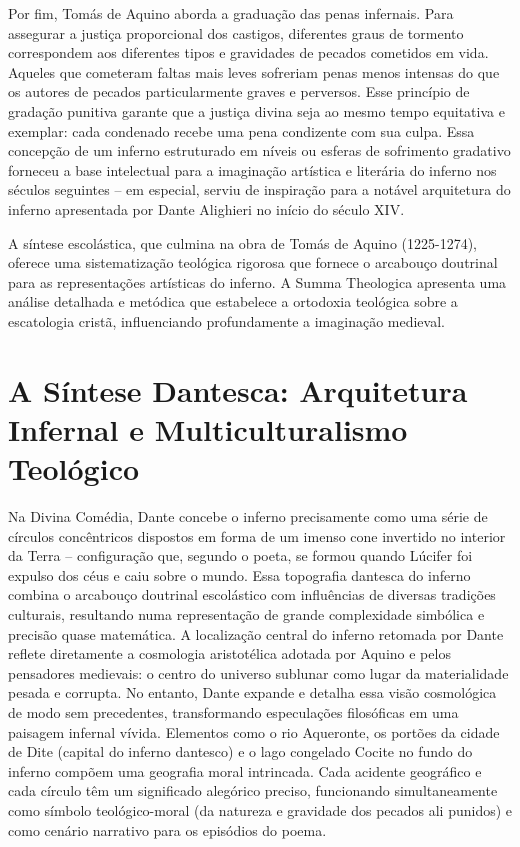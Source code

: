 Por fim, Tomás de Aquino aborda a graduação das penas infernais. Para assegurar a justiça proporcional dos castigos, diferentes graus de tormento correspondem aos diferentes tipos e gravidades de pecados cometidos em vida. Aqueles que cometeram faltas mais leves sofreriam penas menos intensas do que os autores de pecados particularmente graves e perversos. Esse princípio de gradação punitiva garante que a justiça divina seja ao mesmo tempo equitativa e exemplar: cada condenado recebe uma pena condizente com sua culpa. Essa concepção de um inferno estruturado em níveis ou esferas de sofrimento gradativo forneceu a base intelectual para a imaginação artística e literária do inferno nos séculos seguintes -- em especial, serviu de inspiração para a notável arquitetura do inferno apresentada por Dante Alighieri no início do século XIV.

A síntese escolástica, que culmina na obra de Tomás de Aquino (1225-1274), oferece uma sistematização teológica rigorosa que fornece o arcabouço doutrinal para as representações artísticas do inferno. A Summa Theologica apresenta uma análise detalhada e metódica que estabelece a ortodoxia teológica sobre a escatologia cristã, influenciando profundamente a imaginação medieval.


\section{A Síntese Dantesca: Arquitetura Infernal e Multiculturalismo Teológico}

Na Divina Comédia, Dante concebe o inferno precisamente como uma série de círculos concêntricos dispostos em forma de um imenso cone invertido no interior da Terra -- configuração que, segundo o poeta, se formou quando Lúcifer foi expulso dos céus e caiu sobre o mundo. Essa topografia dantesca do inferno combina o arcabouço doutrinal escolástico com influências de diversas tradições culturais, resultando numa representação de grande complexidade simbólica e precisão quase matemática. A localização central do inferno retomada por Dante reflete diretamente a cosmologia aristotélica adotada por Aquino e pelos pensadores medievais: o centro do universo sublunar como lugar da materialidade pesada e corrupta. No entanto, Dante expande e detalha essa visão cosmológica de modo sem precedentes, transformando especulações filosóficas em uma paisagem infernal vívida. Elementos como o rio Aqueronte, os portões da cidade de Dite (capital do inferno dantesco) e o lago congelado Cocite no fundo do inferno compõem uma geografia moral intrincada. Cada acidente geográfico e cada círculo têm um significado alegórico preciso, funcionando simultaneamente como símbolo teológico-moral (da natureza e gravidade dos pecados ali punidos) e como cenário narrativo para os episódios do poema.

